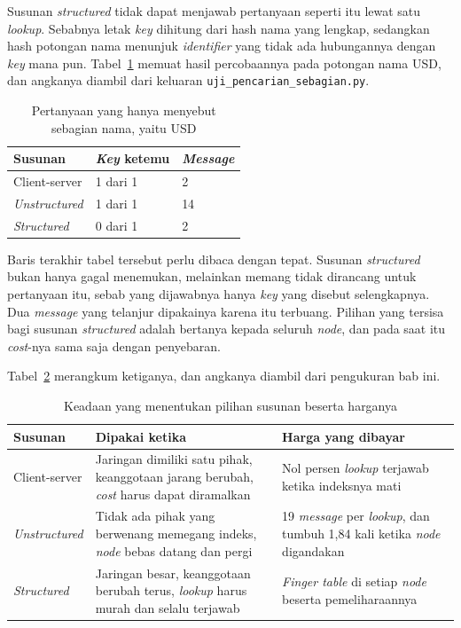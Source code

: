 Susunan \textit{structured} tidak dapat menjawab pertanyaan seperti itu lewat
satu \textit{lookup}. Sebabnya letak \textit{key} dihitung dari hash nama yang lengkap,
sedangkan hash potongan nama menunjuk \textit{identifier} yang tidak ada hubungannya dengan
\textit{key} mana pun. Tabel~\ref{tab:sebagian} memuat hasil percobaannya pada potongan
nama USD, dan angkanya diambil dari keluaran
\texttt{uji\_pencarian\_sebagian.py}.

\begin{table}[htbp]
  \centering
  \caption{Pertanyaan yang hanya menyebut sebagian nama, yaitu USD}
  \label{tab:sebagian}
  \begin{tabularx}{\textwidth}{|X|l|l|}
    \hline
    \textbf{Susunan} & \textbf{\textit{Key} ketemu} & \textbf{\textit{Message}} \\
    \hline
    Client-server & 1 dari 1 & 2 \\
    \hline
    \textit{Unstructured} & 1 dari 1 & 14 \\
    \hline
    \textit{Structured} & 0 dari 1 & 2 \\
    \hline
  \end{tabularx}
\end{table}

Baris terakhir tabel tersebut perlu dibaca dengan tepat. Susunan
\textit{structured} bukan hanya gagal menemukan, melainkan memang tidak dirancang
untuk pertanyaan itu, sebab yang dijawabnya hanya \textit{key} yang disebut selengkapnya.
Dua \textit{message} yang telanjur dipakainya karena itu terbuang. Pilihan yang tersisa bagi
susunan \textit{structured} adalah bertanya kepada seluruh \textit{node}, dan
pada saat itu \textit{cost}-nya sama saja dengan penyebaran.

Tabel~\ref{tab:konteks-p2p} merangkum ketiganya, dan angkanya diambil dari
pengukuran bab ini.

\begin{table}[htbp]
  \centering
  \caption{Keadaan yang menentukan pilihan susunan beserta harganya}
  \label{tab:konteks-p2p}
  \begin{tabularx}{\textwidth}{|l|X|X|}
    \hline
    \textbf{Susunan} & \textbf{Dipakai ketika} & \textbf{Harga yang dibayar} \\
    \hline
    Client-server & Jaringan dimiliki satu pihak, keanggotaan jarang berubah, \textit{cost} harus dapat diramalkan & Nol persen \textit{lookup} terjawab ketika indeksnya mati \\
    \hline
    \textit{Unstructured} & Tidak ada pihak yang berwenang memegang indeks, \textit{node} bebas datang dan pergi & 19 \textit{message} per \textit{lookup}, dan tumbuh 1,84 kali ketika \textit{node} digandakan \\
    \hline
    \textit{Structured} & Jaringan besar, keanggotaan berubah terus, \textit{lookup} harus murah dan selalu terjawab & \textit{Finger table} di setiap \textit{node} beserta pemeliharaannya \\
    \hline
  \end{tabularx}
\end{table}

